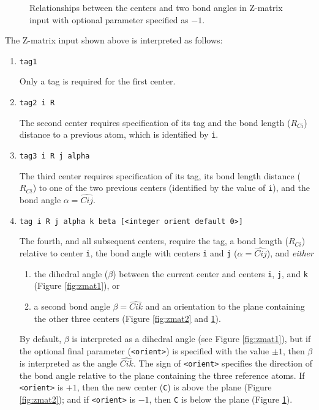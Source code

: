 \begin{figure}[htbp]
\centering
{}

\caption{\label{fig:zmat3} Relationships between the centers and two
  bond angles in Z-matrix input with optional parameter specified as $-1$.}
\end{figure}

The Z-matrix input shown above is interpreted as follows:
\begin{enumerate}

   \item \verb+tag1+

   Only  a  tag  is required for the first center.

   \item \verb+tag2 i R+

     The second center requires specification of its tag and the
     bond length ($R_{Ci}$) distance to a previous atom, which is identified by
     \verb+i+.

   \item \verb+tag3 i R j alpha+

     The third center requires specification of its tag, its bond length distance
     ($R_{Ci}$) to one of the two previous centers (identified by the
     value of \verb+i+), and the bond angle $\alpha = \widehat{Cij}$.

   \item \verb+tag i R j alpha k beta [<integer orient default 0>]+

     The fourth, and all subsequent centers, require the tag, a bond
     length ($R_{Ci}$) relative to center \verb+i+, the bond angle with
     centers \verb+i+ and \verb+j+ ($\alpha = \widehat{Cij}$), and {\em either} 
    \begin{enumerate}
    \item the dihedral angle ($\beta$) between the current center and centers
      \verb+i+, \verb+j+, and \verb+k+ (Figure \ref{fig:zmat1}), or
      \item  a second bond angle $\beta = \widehat{Cik}$ and an orientation to 
      the plane containing the other three centers (Figure
      \ref{fig:zmat2} and \ref{fig:zmat3}).
    \end{enumerate}

    By default, $\beta$ is interpreted as a dihedral angle (see Figure
    \ref{fig:zmat1}), but if the optional final parameter (\verb+<orient>+) is
    specified with the value $\pm 1$, then $\beta$ is interpreted as
    the angle $\widehat{Cik}$.  The sign of \verb+<orient>+ specifies the
    direction of the bond angle relative to the plane containing the
    three reference atoms.  If \verb+<orient>+ is $+1$, then the new center
    (\verb+C+) is above the plane (Figure \ref{fig:zmat2}); and if
    \verb+<orient>+ is $-1$, then \verb+C+ is below the plane (Figure
    \ref{fig:zmat3}).
\end{enumerate}

